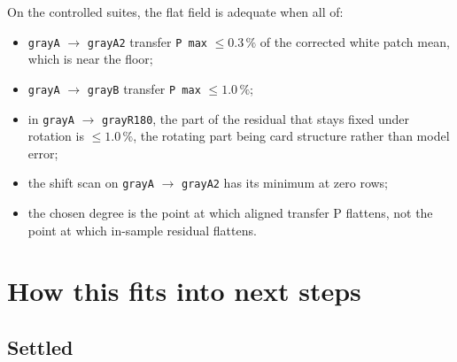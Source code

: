 \documentclass[11pt, a4paper]{article}
\newcommand{\code}[1]{\texttt{#1}}
\newcommand{\pct}{\,\%}
\begin{document}
On the controlled suites, the flat field is adequate when all of:

\begin{itemize}[nosep]
  \item \code{grayA} $\rightarrow$ \code{grayA2} transfer \code{P max}
        $\le 0.3\pct$ of the corrected white patch mean,
        which is near the floor;
  \item \code{grayA} $\rightarrow$ \code{grayB} transfer \code{P max}
        $\le 1.0\pct$;
  \item in \code{grayA} $\rightarrow$ \code{grayR180},
        the part of the residual that stays fixed under rotation
        is $\le 1.0\pct$,
        the rotating part being card structure rather than model error;
  \item the shift scan on \code{grayA} $\rightarrow$ \code{grayA2}
        has its minimum at zero rows;
  \item the chosen degree is the point at which aligned transfer P
        flattens,
        not the point at which in-sample residual flattens.
\end{itemize}

\section{How this fits into next steps}
\label{sec:next}

\subsection{Settled}
\end{document}
